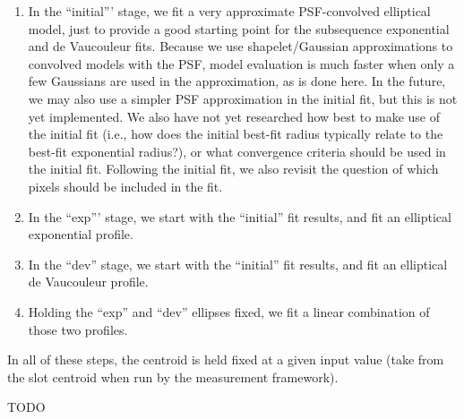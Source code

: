  \begin{enumerate}

 \item In the ``initial''' stage, we fit a very approximate PSF-convolved elliptical model, just to provide a good starting point for the subsequence exponential and de Vaucouleur fits.
 Because we use shapelet/Gaussian approximations to convolved models with the PSF, model evaluation is much faster when only a few Gaussians are used in the approximation, as is done here.
 In the future, we may also use a simpler PSF approximation in the initial fit, but this is not yet implemented.
 We also have not yet researched how best to make use of the initial fit (i.e., how does the initial best-fit radius typically relate to the best-fit exponential radius?), or what convergence criteria should be used in the initial fit.
 Following the initial fit, we also revisit the question of which pixels should be included in the fit.

 \item In the ``exp''' stage, we start with the ``initial'' fit results, and fit an elliptical exponential profile.

 \item In the ``dev'' stage, we start with the ``initial'' fit results, and fit an elliptical de Vaucouleur profile.

 \item Holding the ``exp'' and ``dev'' ellipses fixed, we fit a linear combination of those two profiles.

 \end{enumerate}

 In all of these steps, the centroid is held fixed at a given input value (take from the slot centroid when run by the measurement framework).

TODO
